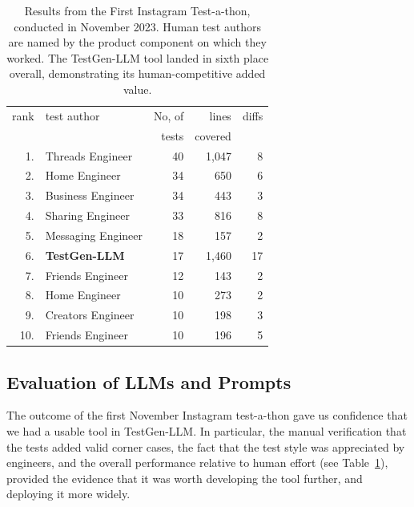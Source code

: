 \documentclass[sigconf,screen]{acmart}
\begin{document}
\begin{table}
\begin{tabular}{||r l r r r ||} 
 \hline
rank & test author          &  No, of & lines   &  diffs                            \\
     &                      & tests   & covered &                                   \\
\hline     
1.   & Threads Engineer     &  40                   & 1,047         &  8            \\   %
2.   & Home Engineer        &  34                   & 650           &  6            \\   %
3.   & Business Engineer    &  34                   & 443           &  3            \\   %
4.   & Sharing Engineer     &  33                   & 816           &  8            \\   %
5.   & Messaging Engineer   &  18                   & 157           &  2            \\   %
6.   & {\bf TestGen-LLM}    & 17                    & 1,460         & 17            \\
7.   & Friends Engineer      & 12                    & 143           & 2             \\   %
8.   & Home Engineer        & 10                    & 273           & 2             \\   %
9.   & Creators Engineer    & 10                    & 198           & 3             \\   %
10.  & Friends Engineer     & 10                    & 196           & 5             \\   %
 \hline

\end{tabular}
\caption{Results from the First Instagram Test-a-thon, conducted in November 2023. 
Human test authors are named by the product component on which they worked.
The TestGen-LLM tool landed in sixth place overall, demonstrating its human-competitive added value. }
\label{tab:novtestathon-ranks}
\end{table}




\subsection{Evaluation of LLMs and Prompts}
\label{sec:extend-test}
\label{sec:experiment}
\label{sec:eval}
The outcome of the first November Instagram test-a-thon gave us confidence that we had a usable tool in TestGen-LLM.
In particular, the manual verification that the tests added valid corner cases, the fact that the test style was appreciated by engineers, and the overall performance relative to human effort (see Table~\ref{tab:novtestathon-ranks}), provided the evidence that it was worth developing the tool further, and deploying it more widely.
\end{document}
